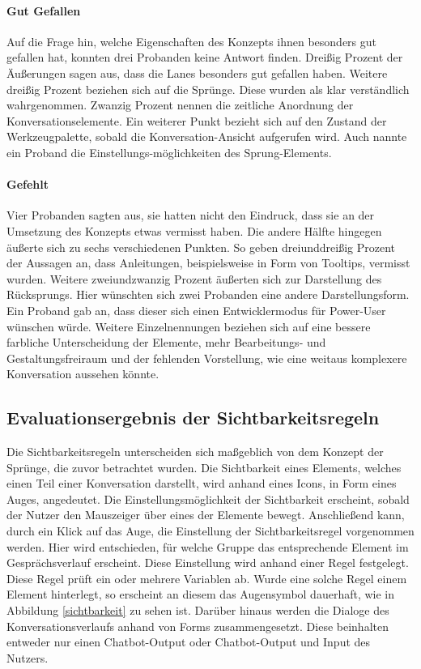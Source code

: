 \paragraph{Gut Gefallen}Auf die Frage hin, welche Eigenschaften des Konzepts ihnen besonders gut gefallen hat, konnten drei Probanden keine Antwort finden. Dreißig Prozent der Äußerungen sagen aus, dass die Lanes besonders gut gefallen haben. Weitere dreißig Prozent beziehen sich auf die Sprünge. Diese wurden als klar verständlich wahrgenommen. Zwanzig Prozent nennen die zeitliche Anordnung der Konversationselemente. Ein weiterer Punkt bezieht sich auf den Zustand der Werkzeugpalette, sobald die Konversation-Ansicht aufgerufen wird. Auch nannte ein Proband die Einstellungs-möglichkeiten des Sprung-Elements.

\paragraph{Gefehlt}Vier Probanden sagten aus, sie hatten nicht den Eindruck, dass sie an der Umsetzung des Konzepts etwas vermisst haben. Die andere Hälfte hingegen äußerte sich zu sechs verschiedenen Punkten. So geben dreiunddreißig Prozent der Aussagen an, dass Anleitungen, beispielsweise in Form von Tooltips, vermisst wurden. Weitere zweiundzwanzig Prozent äußerten sich zur Darstellung des Rücksprungs. Hier wünschten sich zwei Probanden eine andere Darstellungsform. Ein Proband gab an, dass dieser sich einen Entwicklermodus für Power-User wünschen würde. Weitere Einzelnennungen beziehen sich auf eine bessere farbliche Unterscheidung der Elemente, mehr Bearbeitungs- und Gestaltungsfreiraum und der fehlenden Vorstellung, wie eine weitaus komplexere Konversation aussehen könnte.    

\subsection{Evaluationsergebnis der Sichtbarkeitsregeln}
Die Sichtbarkeitsregeln unterscheiden sich maßgeblich von dem Konzept der Sprünge, die zuvor betrachtet wurden. Die Sichtbarkeit eines Elements, welches einen Teil einer Konversation darstellt, wird anhand eines Icons, in Form eines Auges, angedeutet. Die Einstellungsmöglichkeit der Sichtbarkeit erscheint, sobald der Nutzer den Mauszeiger über eines der Elemente bewegt. Anschließend kann, durch ein Klick auf das Auge, die Einstellung der Sichtbarkeitsregel vorgenommen werden. Hier wird entschieden, für welche Gruppe das entsprechende Element im Gesprächsverlauf erscheint. Diese Einstellung wird anhand einer Regel festgelegt. Diese Regel prüft ein oder mehrere Variablen ab. Wurde eine solche Regel einem Element hinterlegt, so erscheint an diesem das Augensymbol dauerhaft, wie in Abbildung \ref{sichtbarkeit} zu sehen ist. Darüber hinaus werden die Dialoge des Konversationsverlaufs anhand von Forms zusammengesetzt. Diese beinhalten entweder nur einen Chatbot-Output oder Chatbot-Output und Input des Nutzers. 

